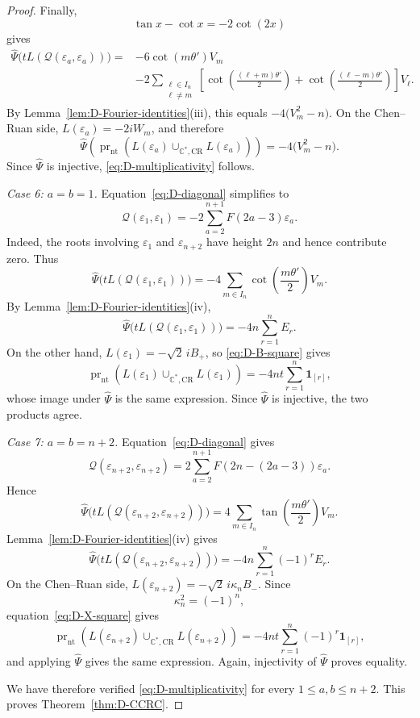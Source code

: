 \documentclass[a4paper,reqno]{amsart}
\theoremstyle{plain} %
\theoremstyle{definition} %
\theoremstyle{remark} %
\newcommand{\1}{\mathds{1}}   %
\begin{document}
\begin{proof}
Finally,
\[
\tan x-\cot x=-2\cot(2x)
\]
gives
\begin{align*}
\widehat\Psi
\bigl(
tL(\mathcal Q(\varepsilon_a,\varepsilon_a))
\bigr)
={}&
-6\cot(m\theta')V_m
\\
&-
2
\sum_{\substack{\ell\in I_n\\\ell\ne m}}
\left[
\cot\left(\frac{(\ell+m)\theta'}{2}\right)
+
\cot\left(\frac{(\ell-m)\theta'}{2}\right)
\right]V_\ell.
\end{align*}
By Lemma~\ref{lem:D-Fourier-identities}(iii), this equals $-4\bigl(V_m^2-n\bigr)$. 
On the Chen--Ruan side, $L(\varepsilon_a)=-2iW_m$, and therefore
\[
\widehat\Psi
\left(
\operatorname{pr}_{\mathrm{nt}}\!\left(
L(\varepsilon_a)
\cup_{\mathbb C^*,\mathrm{CR}}
L(\varepsilon_a)
\right)
\right)
=
-4\bigl(V_m^2-n\bigr).
\]
Since \(\widehat\Psi\) is injective,
\eqref{eq:D-multiplicativity} follows.

\medskip
\noindent
\textit{Case 6: \(a=b=1\).}
Equation~\eqref{eq:D-diagonal} simplifies to
\[
\mathcal Q(\varepsilon_1,\varepsilon_1)
=
-2
\sum_{a=2}^{n+1}
F(2a-3)\varepsilon_a.
\]
Indeed, the roots involving \(\varepsilon_1\) and
\(\varepsilon_{n+2}\) have height \(2n\) and hence contribute
zero. Thus
\[
\widehat\Psi
\bigl(
tL(\mathcal Q(\varepsilon_1,\varepsilon_1))
\bigr)
=
-4\sum_{m\in I_n}
\cot\left(\frac{m\theta'}{2}\right)V_m.
\]
By Lemma~\ref{lem:D-Fourier-identities}(iv),
\[
\widehat\Psi
\bigl(
tL(\mathcal Q(\varepsilon_1,\varepsilon_1))
\bigr)
=
-4n\sum_{r=1}^nE_r.
\]
On the other hand, $L(\varepsilon_1)=-\sqrt2\,iB_+$, so \eqref{eq:D-B-square} gives
\[
\operatorname{pr}_{\mathrm{nt}}\!\left(L(\varepsilon_1)
\cup_{\mathbb C^*,\mathrm{CR}}
L(\varepsilon_1)\right)
=
-4nt\sum_{r=1}^n\mathbf1_{[r]},
\]
whose image under \(\widehat\Psi\) is the same expression.
Since \(\widehat\Psi\) is injective, the two products agree.

\medskip
\noindent
\textit{Case 7: \(a=b=n+2\).}
Equation~\eqref{eq:D-diagonal} gives
\[
\mathcal Q(\varepsilon_{n+2},\varepsilon_{n+2})
=
2
\sum_{a=2}^{n+1}
F(2n-(2a-3))\varepsilon_a.
\]
Hence
\[
\widehat\Psi
\bigl(
tL(\mathcal Q(\varepsilon_{n+2},\varepsilon_{n+2}))
\bigr)
=
4\sum_{m\in I_n}
\tan\left(\frac{m\theta'}{2}\right)V_m.
\]
Lemma~\ref{lem:D-Fourier-identities}(iv) gives
\[
\widehat\Psi
\bigl(
tL(\mathcal Q(\varepsilon_{n+2},\varepsilon_{n+2}))
\bigr)
=
-4n\sum_{r=1}^n(-1)^rE_r.
\]
On the Chen--Ruan side, $L(\varepsilon_{n+2}) = -\sqrt2\, i\kappa_nB_-$. 
Since
\[
\kappa_n^2=(-1)^{n},
\]
equation~\eqref{eq:D-X-square} gives
\[
\operatorname{pr}_{\mathrm{nt}}\!\left(L(\varepsilon_{n+2})
\cup_{\mathbb C^*,\mathrm{CR}}
L(\varepsilon_{n+2})\right)
=
-4nt\sum_{r=1}^n(-1)^r\mathbf1_{[r]},
\]
and applying \(\widehat\Psi\) gives the same expression.
Again, injectivity of \(\widehat\Psi\) proves equality.


We have therefore verified \eqref{eq:D-multiplicativity} for every \(1\le a,b\le n+2\). 
This proves Theorem~\ref{thm:D-CCRC}.
\end{proof}
\end{document}
